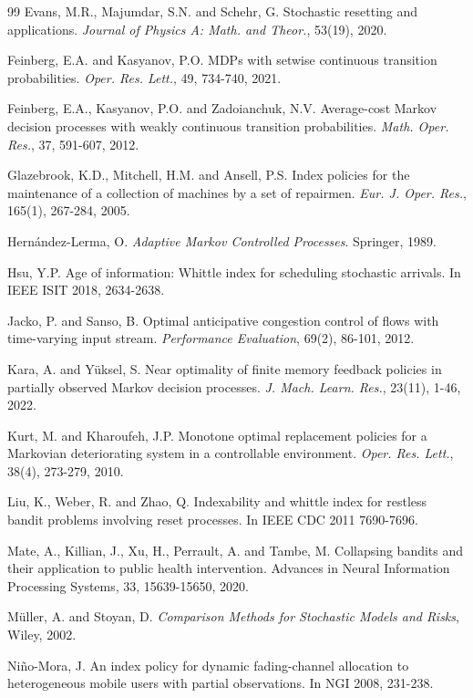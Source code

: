 \documentclass[letterpaper,10pt,conference]{ieeeconf}  %
\begin{document}
\begin{thebibliography}{99}
 Evans, M.R., Majumdar, S.N. and Schehr, G. Stochastic resetting and applications. {\it Journal of Physics A: Math. and Theor.}, 53(19), 2020.

 Feinberg, E.A. and Kasyanov, P.O. MDPs with setwise continuous transition probabilities. 
{\it Oper. Res. Lett.}, 49, 734-740, 2021.

  Feinberg, E.A.,  Kasyanov, P.O. and  Zadoianchuk, N.V. Average-cost Markov decision processes with weakly continuous transition probabilities. {\it Math. Oper. Res.}, 37, 591-607, 2012.

 Glazebrook, K.D., Mitchell, H.M. and Ansell, P.S. Index policies for the maintenance of a collection of machines by a set of repairmen. {\it Eur. J. Oper. Res.}, 165(1), 267-284, 2005.

 Hern\'andez-Lerma, O. {\it Adaptive Markov Controlled
Processes}. Springer, 1989.

 Hsu, Y.P. Age of information: {W}hittle index for scheduling stochastic arrivals. In IEEE ISIT 2018, 2634-2638.

 Jacko, P. and Sanso, B. Optimal anticipative congestion control of flows with time-varying input stream. {\it Performance Evaluation}, 69(2), 86-101, 2012.

 Kara, A. and Y\"{u}ksel, S. Near optimality of finite memory feedback policies in partially observed {M}arkov decision processes. {\it J. Mach. Learn. Res.}, 23(11), 1-46, 2022.

 Kurt, M. and Kharoufeh, J.P. Monotone optimal replacement policies for a Markovian deteriorating system in a controllable environment. {\it Oper. Res. Lett.}, 38(4), 273-279, 2010.

 Liu, K., Weber, R. and Zhao, Q. Indexability and whittle index for restless bandit problems involving reset processes. In IEEE CDC 2011 7690-7696. 

 Mate, A., Killian, J., Xu, H., Perrault, A. and Tambe, M. Collapsing bandits and their application to public health intervention. Advances in Neural Information Processing Systems, 33, 15639-15650, 2020.

 M\"{u}ller, A. and Stoyan, D. 
{\it Comparison Methods for Stochastic Models and Risks}, Wiley, 2002.

 Ni\~{n}o-Mora, J. An index policy for dynamic fading-channel allocation to heterogeneous mobile users with partial observations. In NGI 2008, 231-238.


\end{thebibliography}
\end{document}
